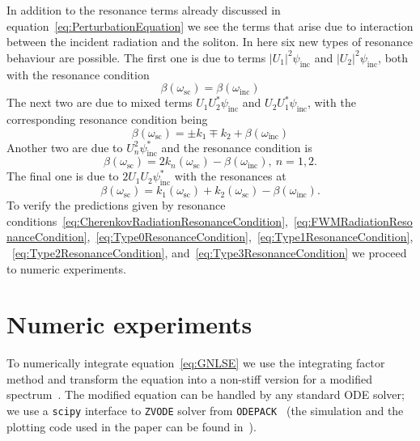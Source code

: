 \documentclass[aps, prl, twocolumn, superscriptaddress, final]{revtex4}
\newcommand{\abs}[1]{\left| #1 \right|}
\begin{document}
In addition to the resonance terms already discussed in equation~\eqref{eq:PerturbationEquation} we see the terms that arise due to interaction between the incident radiation and the soliton. In here six new types of resonance behaviour are possible. The first one is due to terms $\abs{U_{1}}^{2} \psi_{\text{inc}}$ and $\abs{U_{2}}^{2} \psi_{\text{inc}}$, both with the resonance condition
\begin{equation}
  \label{eq:Type0ResonanceCondition}
  \beta(\omega_{\text{sc}}) = \beta(\omega_{\text{inc}})
\end{equation}
The next two are due to mixed terms $U_{1} U_{2}^{*} \psi_{\text{inc}}$ and $U_{2} U_{1}^{*} \psi_{\text{inc}}$, with the corresponding resonance condition being
\begin{equation}
  \label{eq:Type1ResonanceCondition}
  \beta(\omega_{\text{sc}}) = \pm k_{1} \mp k_{2} + \beta(\omega_{\text{inc}})
\end{equation}
Another two are due to $U_{n}^{2} \psi_{\text{inc}}^{*}$ and the resonance condition is
\begin{equation}
  \label{eq:Type2ResonanceCondition}
  \beta(\omega_{\text{sc}}) =
    2 k_{n}(\omega_{\text{sc}}) -
    \beta(\omega_{\text{inc}}), ~ n = 1, 2.
\end{equation}
The final one is due to $2 U_{1} U_{2} \psi_{\text{inc}}^{*}$ with the resonances at
\begin{equation}
  \label{eq:Type3ResonanceCondition}
  \beta(\omega_{\text{sc}}) =
    k_{1}(\omega_{\text{sc}}) +
    k_{2}(\omega_{\text{sc}}) -
    \beta(\omega_{\text{inc}}).
\end{equation}
To verify the predictions given by resonance conditions~\eqref{eq:CherenkovRadiationResonanceCondition},~\eqref{eq:FWMRadiationResonanceCondition},~\eqref{eq:Type0ResonanceCondition},~\eqref{eq:Type1ResonanceCondition},~\eqref{eq:Type2ResonanceCondition}, and~\eqref{eq:Type3ResonanceCondition} we proceed to numeric experiments.

\section{Numeric experiments}%
\label{sec:NumericExperiments}

To numerically integrate equation~\eqref{eq:GNLSE} we use the integrating factor method and transform the equation into a non-stiff version for a modified spectrum~\cite{dudley2010supercontinuum}. The modified equation can be handled by any standard ODE solver; we use a \texttt{scipy} interface to \texttt{ZVODE} solver from \texttt{ODEPACK}~\cite{hindmarsh1983odepack, virtanen2020scipy} (the simulation and the plotting code used in the paper can be found in~\cite{sources}).
\end{document}
